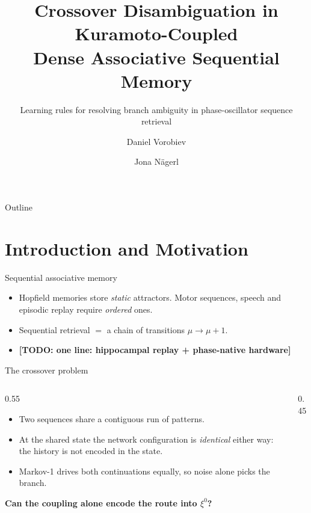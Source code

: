 \documentclass[aspectratio=169]{beamer}
\title[Kuramoto DAM: Crossover Disambiguation]{Crossover Disambiguation in Kuramoto-Coupled\\ Dense Associative Sequential Memory}
\subtitle{Learning rules for resolving branch ambiguity in phase-oscillator sequence retrieval}
\author[D. Vorobiev \and J. N\"agerl]{Daniel Vorobiev \and Jona N\"agerl}
\institute{University of Cambridge}
\newcommand{\xxi}{\xi}
\newcommand{\TODO}[1]{{\color{red}\textbf{[TODO: #1]}}}
\begin{document}
\begin{frame}
  \titlepage
\end{frame}

\begin{frame}{Outline}
  \tableofcontents
\end{frame}


\section[Introduction]{Introduction and Motivation}

\begin{frame}{Sequential associative memory}
  \begin{itemize}
    \item Hopfield memories store \emph{static} attractors. Motor sequences,
      speech and episodic replay require \emph{ordered} ones.
    \item Sequential retrieval $=$ a chain of transitions $\mu \to \mu+1$.
    \item \TODO{one line: hippocampal replay + phase-native hardware}
  \end{itemize}
\end{frame}

\begin{frame}{The crossover problem}
  \begin{columns}
    \begin{column}{0.55\textwidth}
      \begin{itemize}
        \item Two sequences share a contiguous run of patterns.
        \item At the shared state the network configuration is
          \emph{identical} either way: the history is not encoded in the state.
        \item Markov-1 drives both continuations equally, so noise alone
          picks the branch.
      \end{itemize}
      \vspace{2mm}
      \centering\textbf{Can the coupling alone encode the route into $\xxi^0$?}
    \end{column}
    \begin{column}{0.45\textwidth}
      \centering
    \end{column}
  \end{columns}
\end{frame}
\end{document}
